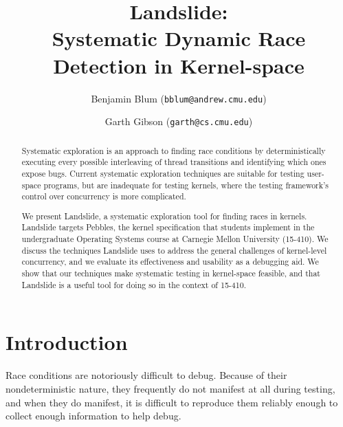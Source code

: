 \documentclass[10pt,twocolumn]{article}
\begin{document}
\title{\bf Landslide: \\ Systematic Dynamic Race Detection in Kernel-space}
\author{Benjamin Blum (\texttt{bblum@andrew.cmu.edu}) \and Garth Gibson (\texttt{garth@cs.cmu.edu})}
\maketitle

\newcommand\true{\;\textit{true}}
\newcommand\false{\;\textit{false}}

\newcommand\alpher\alpha
\newcommand\beter\beta
\newcommand\gammer\gamma
\newcommand\delter\delta
\newcommand\zeter\zeta
\newcommand\Sigmer\Sigma

\newcommand\NN{\mathbb{N}}
\newcommand\QQ{\mathbb{Q}}
\newcommand\RR{\mathbb{R}}
\newcommand\ZZ{\mathbb{Z}}

\begin{abstract}
Systematic exploration is an approach to finding race conditions by deterministically executing every possible interleaving of thread transitions and identifying which ones expose bugs.
Current systematic exploration techniques are suitable for testing user-space programs, but are inadequate for testing kernels, where the testing framework's control over concurrency is more complicated.

We present Landslide, a systematic exploration tool for finding races in kernels.
Landslide targets Pebbles, the kernel specification that students implement in the undergraduate Operating Systems course at Carnegie Mellon University (15-410).
We discuss the techniques Landslide uses to address the general challenges of kernel-level concurrency, and we evaluate its effectiveness and usability as a debugging aid.
We show that our techniques make systematic testing in kernel-space feasible, and that Landslide is a useful tool for doing so in the context of 15-410.
\end{abstract}

\section{Introduction}

Race conditions are notoriously difficult to debug.
Because of their nondeterministic nature, they frequently do not manifest at all during testing, and when they do manifest, it is difficult to reproduce them reliably enough to collect enough information to help debug.
\end{document}
